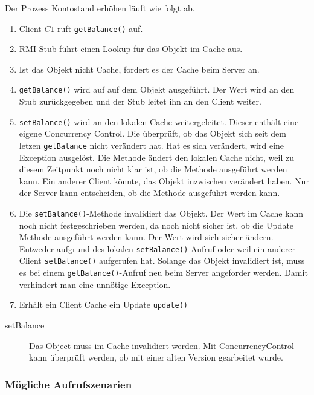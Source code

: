 Der Prozess Kontostand erhöhen läuft wie folgt ab.

\begin{enumerate}
\item Client $C1$ ruft \verb+getBalance()+ auf.
\item RMI-Stub führt einen Lookup für das Objekt im Cache aus.
\item Ist das Objekt nicht Cache, fordert es der Cache beim Server an.
\item \verb+getBalance()+ wird auf auf dem Objekt ausgeführt. Der Wert wird an den Stub zurückgegeben und der Stub leitet ihn an den Client weiter.
\item \verb+setBalance()+ wird an den lokalen Cache weitergeleitet. Dieser enthält eine eigene Concurrency Control. Die überprüft, ob das Objekt sich seit dem letzen \verb+getBalance+ nicht verändert hat. Hat es sich verändert, wird eine Exception ausgelöst. Die Methode ändert den lokalen Cache nicht, weil zu diesem Zeitpunkt noch nicht klar ist, ob die Methode ausgeführt werden kann. Ein anderer Client könnte, das Objekt inzwischen verändert haben. Nur der Server kann entscheiden, ob die Methode ausgeführt werden kann.
\item Die \verb+setBalance()+-Methode invalidiert das Objekt. Der Wert im Cache kann noch nicht festgeschrieben werden, da noch nicht sicher ist, ob die Update Methode ausgeführt werden kann. Der Wert wird sich sicher ändern. Entweder aufgrund des lokalen \verb+setBalance()+-Aufruf oder weil ein anderer Client \verb+setBalance()+ aufgerufen hat. Solange das Objekt invalidiert ist, muss es bei einem \verb+getBalance()+-Aufruf neu beim Server angeforder werden. Damit verhindert man eine unnötige Exception.
\item Erhält ein Client Cache ein Update \verb+update()+
\end{enumerate}

\begin{description}
\item [setBalance] Das Object muss im Cache invalidiert werden. Mit ConcurrencyControl kann überprüft werden, ob mit einer alten Version gearbeitet wurde.
\end{description}

\subsubsection{Mögliche Aufrufszenarien}
\label{sec:mogl-aufr}

